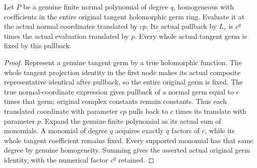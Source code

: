 \begin{theorem}
\label{hir:actual-normal-scaling-translated-polynomial}
\leanok
Let $P$ be a genuine finite normal polynomial of degree $q$, homogeneous
with coefficients in the entire original tangent holomorphic germ ring.
Evaluate it at the actual normal coordinates translated by $cp$. Its
actual pullback by $L_c$ is $c^q$ times the actual evaluation translated
by $p$. Every whole actual tangent germ is fixed by this pullback.
\end{theorem}
\begin{proof}
Represent a genuine tangent germ by a true holomorphic function. The
whole tangent projection identity in the first node makes its actual
composite representative identical after pullback, so the entire
original germ is fixed. The true normal-coordinate expression gives
pullback of a normal germ equal to $c$ times that germ; original complex
constants remain constants. Thus each translated coordinate with
parameter $cp$ pulls back to $c$ times its translate with parameter $p$.
Expand the genuine finite polynomial as its actual sum of monomials.
A monomial of degree $q$ acquires exactly $q$ factors of $c$, while its
whole tangent coefficient remains fixed. Every supported monomial has
that same degree by genuine homogeneity. Summing gives the asserted
actual original germ identity, with the numerical factor $c^q$ retained.
\end{proof}

